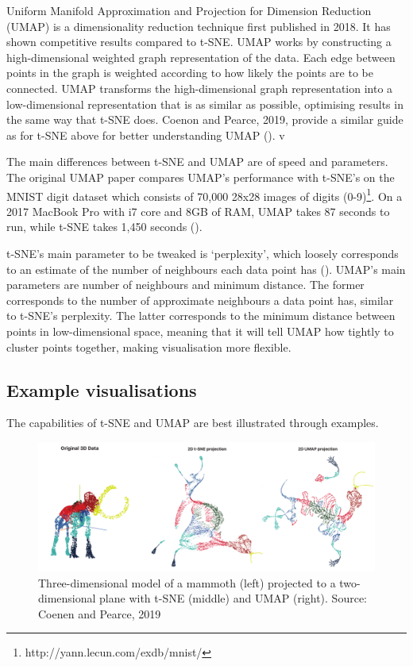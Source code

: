 Uniform Manifold Approximation and Projection for Dimension Reduction (UMAP) is a dimensionality reduction technique first published in 2018. It has shown competitive results compared to t-SNE. UMAP works by constructing a high-dimensional weighted graph representation of the data. Each edge between points in the graph is weighted according to how likely the points are to be connected. UMAP transforms the high-dimensional graph representation into a low-dimensional representation that is as similar as possible, optimising results in the same way that t-SNE does. Coenon and Pearce, 2019, provide a similar guide as for t-SNE above for better understanding UMAP (\cite{https://pair-code.github.io/understanding-umap/}).   v

The main differences between t-SNE and UMAP are of speed and parameters. The original UMAP paper compares UMAP's performance with t-SNE's on the MNIST digit dataset which consists of 70,000 28x28 images of digits (0-9)\footnote{http://yann.lecun.com/exdb/mnist/}. On a 2017 MacBook Pro with i7 core and 8GB of RAM, UMAP takes 87 seconds to run, while t-SNE takes 1,450 seconds (\cite{https://arxiv.org/pdf/1802.03426.pdf}).

t-SNE's main parameter to be tweaked is `perplexity', which loosely corresponds to an estimate of the number of neighbours each data point has (\cite{https://distill.pub/2016/misread-tsne/}). UMAP's main parameters are number of neighbours and minimum distance. The former corresponds to the number of approximate neighbours a data point has, similar to t-SNE's perplexity. The latter corresponds to the minimum distance between points in low-dimensional space, meaning that it will tell UMAP how tightly to cluster points together, making visualisation more flexible.

\subsection{Example visualisations}

The capabilities of t-SNE and UMAP are best illustrated through examples.

\begin{figure}[h]
    \centering
    \includegraphics[width=\textwidth]{dissertation/figures/mammoth_vis.pdf}
    \caption{Three-dimensional model of a mammoth (left) projected to a two-dimensional plane with t-SNE (middle) and UMAP (right). Source: Coenen and Pearce, 2019}
    \label{fig:vis_mammoth}
\end{figure}

